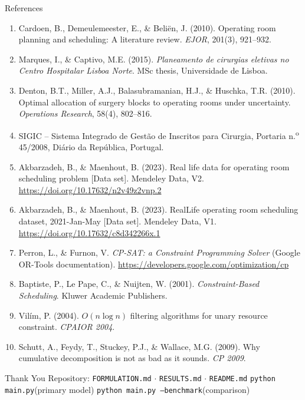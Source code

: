 \documentclass[aspectratio=169]{beamer}
\begin{document}
\begin{frame}{References}
  \tiny
  \begin{enumerate}
    \item Cardoen, B., Demeulemeester, E., \& Beli\"en, J. (2010). Operating room
      planning and scheduling: A literature review. \emph{EJOR}, 201(3), 921--932.
    \item Marques, I., \& Captivo, M.E. (2015). \emph{Planeamento de cirurgias
      eletivas no Centro Hospitalar Lisboa Norte}. MSc thesis, Universidade de
      Lisboa.
    \item Denton, B.T., Miller, A.J., Balasubramanian, H.J., \& Huschka, T.R. (2010).
      Optimal allocation of surgery blocks to operating rooms under uncertainty.
      \emph{Operations Research}, 58(4), 802--816.
    \item SIGIC -- Sistema Integrado de Gest\~ao de Inscritos para Cirurgia,
      Portaria n.\textsuperscript{o} 45/2008, Di\'ario da Rep\'ublica, Portugal.
    \item Akbarzadeh, B., \& Maenhout, B. (2023). Real life data for operating room
      scheduling problem [Data set]. Mendeley Data, V2.
      \url{https://doi.org/10.17632/n2v49z2vnp.2}
    \item Akbarzadeh, B., \& Maenhout, B. (2023). RealLife operating room scheduling
      dataset, 2021-Jan-May [Data set]. Mendeley Data, V1.
      \url{https://doi.org/10.17632/c8d342266x.1}
    \item Perron, L., \& Furnon, V. \emph{CP-SAT: a Constraint Programming Solver}
      (Google OR-Tools documentation). \url{https://developers.google.com/optimization/cp}
    \item Baptiste, P., Le Pape, C., \& Nuijten, W. (2001). \emph{Constraint-Based
      Scheduling}. Kluwer Academic Publishers.
    \item Vil\'im, P. (2004). $O(n\log n)$ filtering algorithms for unary resource
      constraint. \emph{CPAIOR 2004}.
    \item Schutt, A., Feydy, T., Stuckey, P.J., \& Wallace, M.G. (2009). Why
      cumulative decomposition is not as bad as it sounds. \emph{CP 2009}.
  \end{enumerate}
\end{frame}

\begin{frame}
  \centering
  \Huge Thank You
  \vfill
  \normalsize Repository: \texttt{FORMULATION.md} $\cdot$
  \texttt{RESULTS.md} $\cdot$ \texttt{README.md}
  \vfill
  \texttt{python main.py}\quad(primary model)\qquad
  \texttt{python main.py --benchmark}\quad(comparison)
\end{frame}
\end{document}
